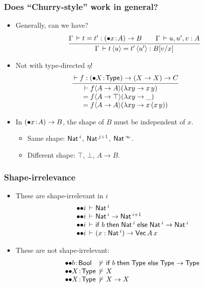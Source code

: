 \documentclass[t,fleqn]{beamer}
\makeatletter
\renewcommand{\ru}[2]{\dfrac{\begin{array}[b]{@{}c@{}} #1 \end{array}}{\begin{array}[t]{@{}l@{}} #2 \end{array}}}
\newcommand{\cAnn}{\color{red!80!black}}%
\renewcommand{\emph}[1]{{\cAnn#1}}
\newcommand{\irr}{\mathord{\bullet}}
\newcommand{\shirr}{\mathord{{\bullet}{\bullet}}}
\renewcommand{\erhyp}[3][\irr]{#1#2 \of #3}
\renewcommand{\erfunT}[4][\irr]{(\erhyp[#1]{#2}{#3}) \to #4}
\makeatother
\begin{document}
\begin{frame}%
  \frametitle{Does ``Churry-style'' work in general?}
  \begin{itemize}
  \item Generally, can we have?
\[
  \ru{\Gamma \der t = t' : \erfunT x A B\qquad
      \Gamma \der u,u',v : A
    }{\Gamma \der t\,\ann u = t'\,\ann{u'} : B[v/x]
    }
\]
\vspace{-2ex}
  \item Not with type-directed $\eta$!
\[
\hspace{-\leftmargin}
\ru{\der f : \erfunT X \Type (X \to X) \to C
  }{\der
    f \ann {A \to A} (\lambda x y \to x\,y) \\ =
    f \ann {A \to \top} (\lambda x y \to \_) \\ =
    f \ann {A \to A} (\lambda x y \to x\,(x\,y))
  }
\]
\vspace{-2ex}
  \item In $\erfunT x A B$, the \emph{shape} of $B$ must be
    independent of $x$.
    \begin{itemize}
    \item Same shape: $\mathsf{Nat}\,^i$, $\mathsf{Nat}\,^{j+1}$, $\mathsf{Nat}\,^\infty$.
    \item Different shape: $\top$, $\bot$, $A \to B$.
    \end{itemize}
\end{itemize}
\end{frame}


\begin{frame}%
  \frametitle{Shape-irrelevance}
\vspace{-2ex}
  \begin{itemize}
  \item These are shape-irrelevant in $i$
\[
\begin{array}{@{\shirr i \der~}l}
  \Nat^i
\\
  \Nat^i \to \Nat^{i+1}
\\
  \tifthenelse b {\Nat^i} {\Nat^i \to \Nat^i}
\\
  (x : \Nat^i) \to \mathsf{Vec}\,A\,x
\end{array}
\]
  \item These are \emph{not} shape-irrelevant:
\[
\begin{array}{@{\shirr}l@{~\not\der~}l}
  b \of \Bool  & \tifthenelse b {\Type} {\Type \to \Type}
\\
  X \of \Type & X
\\
  X \of \Type & X \to X
\\
\end{array}
\]
  \end{itemize}
\end{frame}
\end{document}
